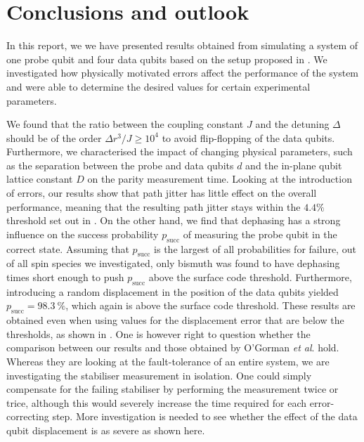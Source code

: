 
\section{Conclusions and outlook } \label{sec:conclusions}
In this report, we we have presented results obtained from simulating a system of one probe qubit and four data qubits based on the setup proposed in \cite{OGorman2016}. We investigated how physically motivated errors affect the performance of the system and were able to determine the desired values for certain experimental parameters. 

We found that the ratio between the coupling constant $J$ and the detuning $\Delta$ should be of the order $\Delta r^3/J \ge 10^4$ to avoid flip-flopping of the data qubits. Furthermore, we characterised the impact of changing physical parameters, such as the separation between the probe and data qubits $d$ and the in-plane qubit lattice constant $D$ on the parity measurement time.  
Looking at the introduction of errors, our results show that path jitter has little effect on the overall performance, meaning that the resulting path jitter stays within the $4.4\%$ threshold set out in \cite{OGorman2016}. On the other hand, we find that dephasing has a strong influence on the success probability $p_{\textrm{succ}}$ of measuring the probe qubit in the correct state. Assuming that $p_{\textrm{succ}}$ is the largest of all probabilities for failure, out of all spin species we investigated, only bismuth was found to have dephasing times short enough to push $p_{\textrm{succ}}$ above the surface code threshold. Furthermore, introducing a random displacement in the position of the data qubits yielded $p_{\textrm{succ}} = \SI{98.3}{\percent}$, which  again is above the surface code threshold. These results are obtained even when using values for the displacement error that are below the thresholds, as shown in \cite{OGorman2016}. One is however right to question whether the comparison between our results and those obtained by O'Gorman \textit{et al}. hold. Whereas they are looking at the fault-tolerance of an entire system, we are investigating the stabiliser measurement in isolation. One could simply compensate for the failing stabiliser by performing the measurement twice or trice, although this would severely increase the time required for each error-correcting step. More investigation is needed to see whether the effect of the data qubit displacement is as severe as shown here. 







